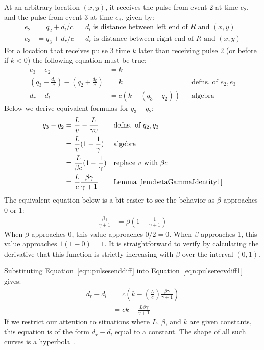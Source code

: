 \documentclass[a4paper]{article}
\theoremstyle{plain}
\theoremstyle{definition}
\begin{document}
At an arbitrary location $(x,y)$, it receives the pulse from event 2
at time $e_2$, and the pulse from event 3 at time $e_3$, given by:
\begin{align*}
e_2 & = q_2 + d_l/c & & \text{$d_l$ is distance between left end of $R$ and $(x,y)$} \\
e_3 & = q_3 + d_r/c & & \text{$d_r$ is distance between right end of $R$ and $(x,y)$}
\end{align*}
For a location that receives pulse 3 time $k$ later than receiving
pulse 2 (or before if $k < 0$) the following equation must be true:
\begin{align}
e_3 - e_2 & = k \nonumber \\
(q_3 + \frac{d_r}{c}) - (q_2 + \frac{d_l}{c}) & = k & & \text{defns. of $e_2, e_3$} \nonumber \\
d_r - d_l & = c (k - (q_3 - q_2)) & & \text{algebra} \label{eqn:pulserecvdiff1}
\end{align}
Below we derive equivalent formulas for $q_3 - q_2$:
\begin{align}
q_3 - q_2
  & = \frac{L}{v} - \frac{L}{\gamma v} & & \text{defns. of $q_2, q_3$} \nonumber \\
  & = \frac{L}{v} (1 - \frac{1}{\gamma}) & & \text{algebra} \nonumber \\
  & = \frac{L}{\beta c} (1 - \frac{1}{\gamma}) & & \text{replace $v$ with $\beta c$} \label{eqn:pulsesenddiff2} \\
  & = \frac{L}{c} \frac{\beta\gamma}{\gamma+1} & & \text{Lemma~\ref{lem:betaGammaIdentity1}} \label{eqn:pulsesenddiff}
\end{align}
The equivalent equation below is a bit easier to see the behavior as
$\beta$ approaches 0 or 1:
\begin{align*}
\frac{\beta\gamma}{\gamma+1} & = \beta(1-\frac{1}{\gamma+1})
\end{align*}
When $\beta$ approaches 0, this value approaches $0/2 = 0$.
When $\beta$ approaches 1, this value approaches $1(1-0) = 1$.
It is straightforward to verify by calculating the derivative that
this function is strictly increasing with $\beta$ over the interval $(0,1)$.

Substituting Equation~\eqref{eqn:pulsesenddiff} into
Equation~\eqref{eqn:pulserecvdiff1} gives:
\begin{align}
d_r - d_l
  & = c \left( k - \left( \frac{L}{c} \right) \frac{\beta\gamma}{\gamma+1} \right) \nonumber \\
  & = ck - \frac{L \beta \gamma}{\gamma+1}
\end{align}
If we restrict our attention to situations where $L$, $\beta$, and $k$
are given constants, this equation is of the form $d_r - d_l$ equal to
a constant.  The shape of all such curves is a
hyperbola~\cite{WikipediaHyperbolaDefnLocusOfPoints}.
\end{document}
